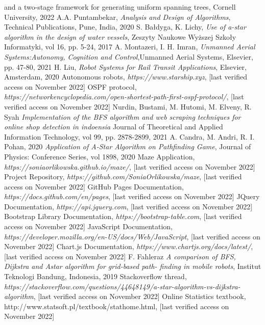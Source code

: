 \begin{thebibliography}{100}
{and a two-stage framework for generating uniform spanning trees}, Cornell University, 2022
A.A. Puntambekar, \emph{Analysis and Design of Algorithms}, Technical Publications, Pune, India, 2020
S. Bałdyga, K. Lichy, \emph{Use of a-star algorithm in the design of water vessels}, Zeszyty Naukowe Wyższej Szkoły Informatyki,
vol 16, pp. 5-24, 2017
A. Montazeri, I. H. Imran, \emph{Unmanned Aerial Systems:Autonomy, Cognition and Control},Unmanned Aerial Systems,
Elsevier, pp. 47-80, 2021
H. Liu, \emph{Robot Systems for Rail Transit Applications}, Elsevier, Amsterdam, 2020
Autonomous robots, \emph{https://www.starship.xyz}, [last verified access on November 2022]
OSPF protocol, \emph{https://networkencyclopedia.com/open-shortest-path-first-ospf-protocol/},
[last verified access on November 2022]
Nurdin, Bustami, M. Hutomi, M. Elveny, R. Syah \emph{Implementation of the BFS algorithm and web scraping techniques
for online shop detection in indoensia} Journal of Theoretical and Applied Information Technology, vol 99, pp. 2878-2899, 2021
A. Candra, M. Andri, R. I. Pohan, 2020 \emph{Application of A-Star Algorithm on Pathfinding Game},
Journal of Physics: Conference Series, vol 1898, 2020
Maze Application, \emph{https://soniaorlikowska.github.io/maze/}, [last verified access on November 2022]
Project Repository, \emph{https://github.com/SoniaOrlikowska/maze}, [last verified access on November 2022]
GitHub Pages Documentation, \emph{https://docs.github.com/en/pages}, [last verified access on November 2022]
JQuery Documentation, \emph{https://api.jquery.com}, [last verified access on November 2022]
Bootstrap Library Documentation, \emph{https://bootstrap-table.com}, [last verified access on November 2022]
 JavaScript Documentation, \emph{https://developer.mozilla.org/en-US/docs/Web/JavaScript}, [last verified access on November 2022]
 Chart.js Documentation, \emph{https://www.chartjs.org/docs/latest/}, [last verified access on November 2022]
F. Fahleraz \emph{A comparison of BFS, Dijkstra and Astar algorithm for grid-based path- finding in mobile robots}, 
Institut Teknologi Bandung, Indonesia, 2019
 Stackoverflow thread, \emph{https://stackoverflow.com/questions/44648149/a-star-algorithm-vs-dijkstra-algorithm},
[last verified access on November 2022]
 Online Statistics textbook, http://www.statsoft.pl/textbook/stathome.html, [last verified access on November 2022]
\end{thebibliography}
